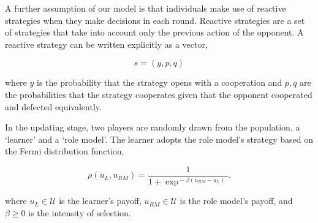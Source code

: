 \documentclass[11pt]{article}
\theoremstyle{plainCl1}
\theoremstyle{plainCl2}
\begin{document}
\begin{table}[!htbp]
  \begin{center}
  \end{center}
  \caption{\textbf{Social dilemmas and payoffs' constrains}. The various social
  dilemmas we explore in this work. Results for cases (i) - (iv) were presented
  in section~\ref{section:2_by_2_games} and results for case (v) were presented
  in section~\ref{section:donation}.}
  \label{table:social_dilemmas}
\end{table}

A further assumption of our model is that individuals make use of reactive
strategies when they make decisions in each round. Reactive strategies are a set
of strategies that take into account only the previous action of the opponent.
A reactive strategy can be written explicitly as a vector,

\[s=(y, p, q)\]

where \(y\) is the probability that the strategy opens with a cooperation and
\(p, q\) are the probabilities that the strategy cooperates given that the
opponent cooperated and defected equivalently.

In the updating stage, two players are randomly drawn from the population, a
`learner' and a `role model'. The learner adopts the role model's strategy
based on the Fermi distribution function, %

\begin{equation} \label{Eq:rho}
\rho(u_{L}, u_{RM}) = \frac{1}{1\!+\! \exp^{\!-\!\beta (u_{RM}\!-\!u_{L})}}.
\end{equation}

where $u_{L}\!\in\! \mathcal{U}$ is the learner's payoff, $u_{RM}\!\in\!
\mathcal{U}$ is the role model's payoff, and $\beta\!\ge\!0$ is the intensity of
selection.
\end{document}
